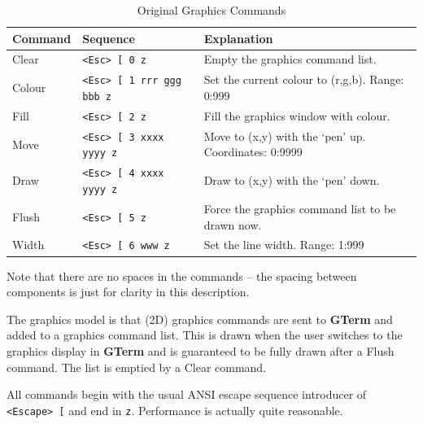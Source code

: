 \documentclass[a4paper,twoside,11pt]{article}
\newcommand{\newpara}{\par\vspace{4mm}\noindent}
\begin{document}
\begin{table}
\centering
\begin{tabular}{|| l | l | l ||}
\hline
Command & Sequence & Explanation\\
\hline
Clear  & \texttt{<Esc> [ 0 z}             & Empty the graphics command list.\\
Colour & \texttt{<Esc> [ 1 rrr ggg bbb z} & Set the current colour to (r,g,b). Range: 0:999\\
Fill   & \texttt{<Esc> [ 2 z}             & Fill the graphics window with colour.\\
Move   & \texttt{<Esc> [ 3 xxxx yyyy z}   & Move to (x,y) with the `pen' up. Coordinates: 0:9999\\
Draw   & \texttt{<Esc> [ 4 xxxx yyyy z}   & Draw to (x,y) with the `pen' down.\\
Flush  & \texttt{<Esc> [ 5 z}             & Force the graphics command list to be drawn now.\\
Width  & \texttt{<Esc> [ 6 www z}         & Set the line width. Range: 1:999\\
\hline
\end{tabular}
\caption{Original Graphics Commands}
\label{tab:graphicscmds}
\end{table}

\noindent
Note that there are no spaces in the commands -- the spacing between components is just for clarity
in this description.
\newpara
The graphics model is that (2D) graphics commands are sent to \textbf{GTerm} and added to a graphics
command list. This is drawn when the user switches to the graphics display in \textbf{GTerm} and is
guaranteed to be fully drawn after a Flush command. The list is emptied by a Clear command.
\newpara
All commands begin with the usual ANSI escape sequence introducer of \texttt{<Escape> [} and 
end in \texttt{z}. Performance is actually quite reasonable.
\end{document}
